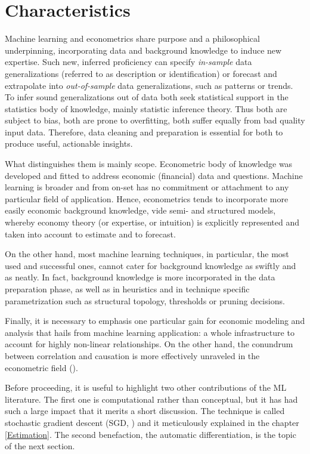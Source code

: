 \documentclass{pracamgr}
\numberwithin{equation}{section}
\begin{document}
\section{Characteristics}

Machine learning and econometrics share purpose and a philosophical underpinning, incorporating data and background knowledge to induce new expertise. Such new, inferred proficiency can specify \textit{in-sample} data generalizations (referred to as description or identification) or forecast and extrapolate into \textit{out-of-sample} data generalizations, such as patterns or trends. To infer sound generalizations out of data both seek statistical support in the statistics body of knowledge, mainly statistic inference theory. Thus both are subject to bias, both are prone to overfitting, both suffer equally from bad quality input data. Therefore, data cleaning and preparation is essential for both to produce useful, actionable insights.

What distinguishes them is mainly scope. Econometric body of knowledge was developed and fitted to address economic (financial) data and questions. Machine learning is broader and from on-set has no commitment or attachment to any particular field of application. Hence, econometrics tends to incorporate more easily economic background knowledge, vide semi- and structured models, whereby economy theory (or expertise, or intuition) is explicitly represented and taken into account to estimate and to forecast.

On the other hand, most machine learning techniques, in particular, the most used and successful ones, cannot cater for background knowledge as swiftly and as neatly. In fact, background knowledge is more incorporated in the data preparation phase, as well as in heuristics and in technique specific parametrization such as structural topology, thresholds or pruning decisions.

Finally, it is necessary to emphasis one particular gain for economic modeling and analysis that hails from machine learning application: a whole infrastructure to account for highly non-linear relationships. On the other hand, the conundrum between correlation and causation is more effectively unraveled in the econometric field (\citet{boelaert2018great}).

Before proceeding, it is useful to highlight two other contributions of the ML literature. The first one is computational rather than conceptual, but it has had such a large impact that it merits a short discussion. The technique is called stochastic gradient descent (SGD, \citet{bottou2010large}) and it meticulously explained in the chapter \ref{Estimation}. The second benefaction, the automatic differentiation, is the topic of the next section.
\end{document}
